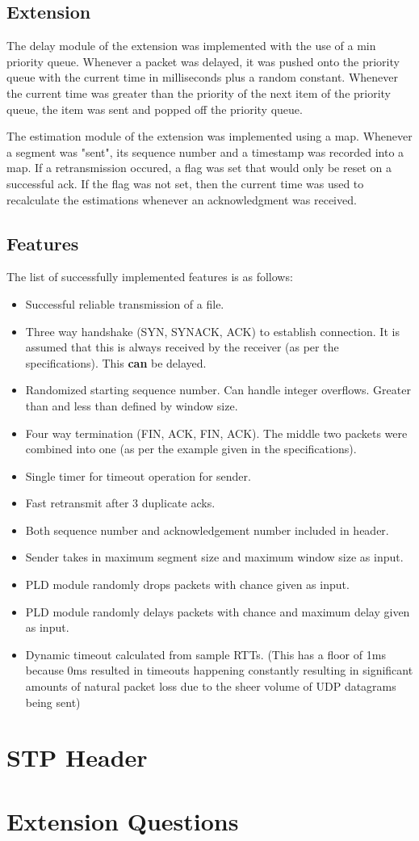 \documentclass[a4paper]{article}
\begin{document}
\subsection{Extension}
The delay module of the extension was implemented with the use of a min priority queue. Whenever a packet was delayed, it was 
pushed onto the priority queue with the current time in milliseconds plus a random constant. Whenever the current time was greater
than the priority of the next item of the priority queue, the item was sent and popped off the priority queue.

The estimation module of the extension was implemented using a map. Whenever a segment was "sent", its sequence number and a 
timestamp was recorded into a map. If a retransmission occured, a flag was set that would only be reset on a successful ack.
If the flag was not set, then the current time was used to recalculate the estimations whenever an acknowledgment was received.

\subsection{Features}
The list of successfully implemented features is as follows:
\begin{itemize}
	\item Successful reliable transmission of a file.
	\item Three way handshake (SYN, SYNACK, ACK) to establish connection. It is assumed that this is always received by the
		receiver (as per the specifications). This \textbf{can} be delayed.
	\item Randomized starting sequence number. Can handle integer overflows. Greater than and less than defined by window size.
	\item Four way termination (FIN, ACK, FIN, ACK). The middle two packets were combined into one (as per the example given in
		the specifications).
	\item Single timer for timeout operation for sender.
	\item Fast retransmit after 3 duplicate acks.
	\item Both sequence number and acknowledgement number included in header.
	\item Sender takes in maximum segment size and maximum window size as input.
	\item PLD module randomly drops packets with chance given as input.
	\item PLD module randomly delays packets with chance and maximum delay given as input.
	\item Dynamic timeout calculated from sample RTTs. (This has a floor of 1ms because 0ms resulted in timeouts happening
		constantly resulting in significant amounts of natural packet loss due to the sheer volume of UDP datagrams being sent)
\end{itemize}

\section{STP Header}

\section{Extension Questions}
\end{document}
